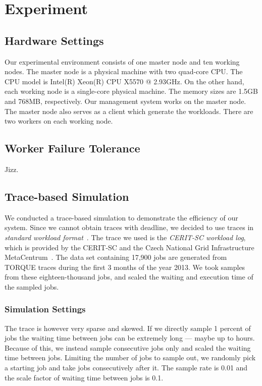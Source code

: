 \section{Experiment}\label{sec:exp}

\subsection{Hardware Settings}

Our experimental environment consists of one master node and ten working nodes.
The master node is a physical machine with two quad-core CPU.
The CPU model is Intel(R) Xeon(R) CPU X5570 @ 2.93GHz.
On the other hand, each working node is a single-core physical machine.
The memory sizes are 1.5GB and 768MB, respectively.
Our management system works on the master node.
The master node also serves as a client which generate the workloads.
There are two workers on each working node.

\subsection{Worker Failure Tolerance}
Jizz.

\subsection{Trace-based Simulation}

We conducted a trace-based simulation to demonstrate the efficiency of
our system.
Since we cannot obtain traces with deadline, we decided to use traces in
{\em standard workload format}~\cite{cite:swf}.
The trace we used is the {\em CERIT-SC workload log}, which is provided
by the CERIT-SC and the Czech National Grid Infrastructure
MetaCentrum~\cite{cite:metacentrum}.
The data set containing 17,900 jobs are generated from TORQUE traces
during the first 3 months of the year 2013.
We took samples from these eighteen-thousand jobs, and scaled the
waiting and execution time of the sampled jobs.

\subsubsection{Simulation Settings}

The trace is however very sparse and skewed.
If we directly sample 1 percent of jobs the waiting time between jobs
can be extremely long --- maybe up to hours.
Because of this, we instead sample consecutive jobs only and scaled the
waiting time between jobs.
Limiting the number of jobs to sample out, we randomly pick a starting
job and take jobs consecutively after it. 
The sample rate is 0.01 and the scale factor of waiting time between
jobs is 0.1.

